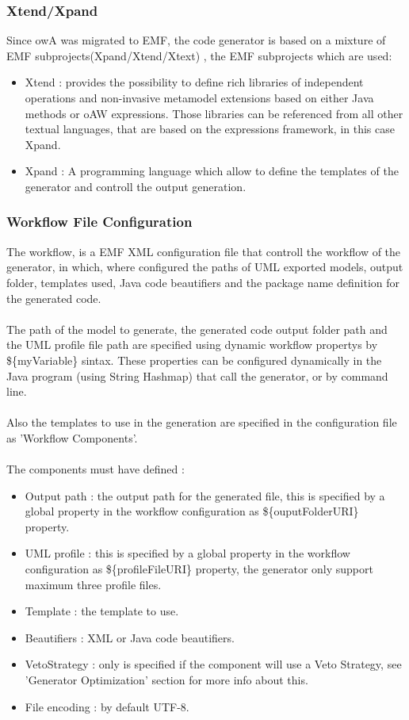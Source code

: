 \subsubsection{Xtend/Xpand}
Since owA was migrated to EMF, the code generator is based on a mixture of EMF
subprojects(Xpand/Xtend/Xtext) , the EMF subprojects which are used:

\begin{itemize}
	\item Xtend : provides the possibility to define rich libraries of independent
	operations and non-invasive metamodel extensions based on either Java methods
	or oAW expressions. Those libraries can be referenced from all other textual
	languages, that are based on the expressions framework, in this case Xpand.
	\item Xpand : A programming language which allow to define the templates of
	the generator and controll the output generation.
\end{itemize}

\subsubsection{Workflow File Configuration}
The workflow, is a EMF XML configuration file that controll the workflow of the
generator, in which, where configured the paths of UML exported models,
output folder, templates used, Java code beautifiers and the package name
definition for the generated code.\\
\\
The path of the model to generate, the generated code output folder path and
the UML profile file path are specified using dynamic workflow propertys by
\$\{myVariable\} sintax. These properties can be configured dynamically in the
Java program (using String Hashmap) that call the generator, or by command
line.\\
\\
Also the templates to use in the generation are specified in the configuration
file as 'Workflow Components'.\\
\\
The components must have defined :
\begin{itemize}
	\item Output path : the output path for the generated file, this is specified
	by a global property in the workflow configuration as \$\{ouputFolderURI\} 
	property.
	\item UML profile : this is specified by a global property in the workflow
	configuration as \$\{profileFileURI\} property, the generator only support
	maximum three profile files.
	\item Template : the template to use.
	\item Beautifiers : XML or Java code beautifiers.
	\item VetoStrategy : only is specified if the component will use a Veto
	Strategy, see 'Generator Optimization' section for more info about this.
	\item File encoding : by default UTF-8.
\end{itemize}

